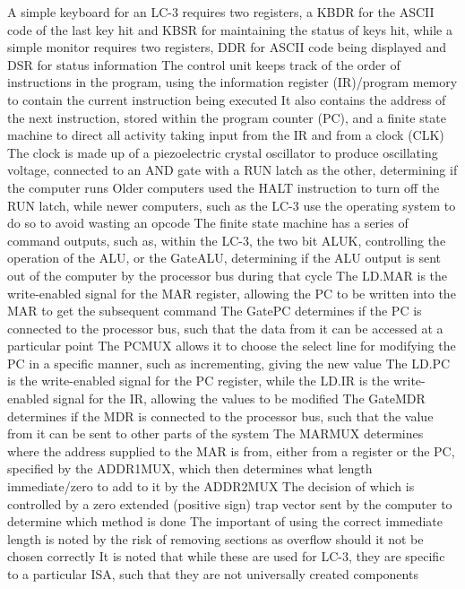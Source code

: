 \documentclass[11 pt, twoside]{article}
\newenvironment{outline*}
{
	\begin{outline}[enumerate]
	}
	{\end{outline}
}
\begin{document}
\begin{outline*}
\2 A simple keyboard for an LC-3 requires two registers, a KBDR for the ASCII code of the last key hit and KBSR for maintaining the status of keys hit, while a simple monitor requires two registers,  DDR for ASCII code being displayed and DSR for status information
\1 The control unit keeps track of the order of instructions in the program, using the information register (IR)/program memory to contain the current instruction being executed
\2 It also contains the address of the next instruction, stored within the program counter (PC), and a finite state machine to direct all activity taking input from the IR and from a clock (CLK)
\3 The clock is made up of a piezoelectric crystal oscillator to produce oscillating voltage, connected to an AND gate with a RUN latch as the other, determining if the computer runs
\3 Older computers used the HALT instruction to turn off the RUN latch, while newer computers, such as the LC-3 use the operating system to do so to avoid wasting an opcode
\2 The finite state machine has a series of command outputs, such as, within the LC-3, the two bit ALUK, controlling the operation of the ALU, or the GateALU, determining if the ALU output is sent out of the computer by the processor bus during that cycle
\3 The LD.MAR is the write-enabled signal for the MAR register, allowing the PC to be written into the MAR to get the subsequent command
\3 The GatePC determines if the PC is connected to the processor bus, such that the data from it can be accessed at a particular point
\3 The PCMUX allows it to choose the select line for modifying the PC in a specific manner, such as incrementing, giving the new value
\3 The LD.PC is the write-enabled signal for the PC register, while the LD.IR is the write-enabled signal for the IR, allowing the values to be modified
\3 The GateMDR determines if the MDR is connected to the processor bus, such that the value from it can be sent to other parts of the system
\3 The MARMUX determines where the address supplied to the MAR is from, either from a register or the PC, specified by the ADDR1MUX, which then determines what length immediate/zero to add to it by the ADDR2MUX
\4 The decision of which is controlled by a zero extended (positive sign) trap vector sent by the computer to determine which method is done
\4 The important of using the correct immediate length is noted by the risk of removing sections as overflow should it not be chosen correctly
\3 It is noted that while these are used for LC-3, they are specific to a particular ISA, such that they are not universally created components
\end{outline*}
\end{document}
